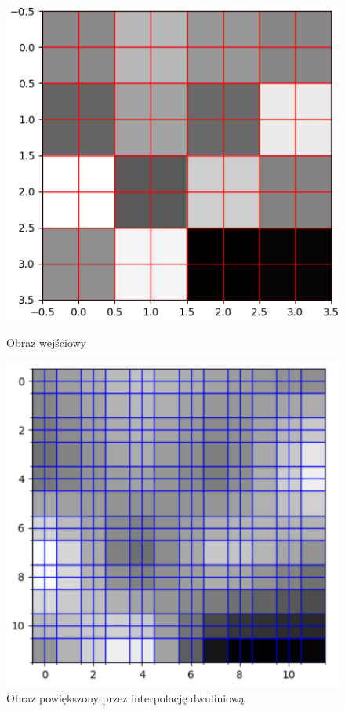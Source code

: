 \begin{figure}[ht]
    \centering
    \begin{minipage}[t]{0.33\linewidth}
        \includegraphics[width=\linewidth]{Rozdziały/02.Podstawy_teoretyczne/bilinear_original.png}
        \caption{Obraz wejściowy}
        \label{fig:image7}
    \end{minipage}
    \hspace{0.5cm}
    \begin{minipage}[t]{0.33\linewidth}
        \includegraphics[width=\linewidth]{Rozdziały/02.Podstawy_teoretyczne/bilinear_enlarged.png}
        \caption{Obraz powiększony przez interpolację dwuliniową}
        \label{fig:image8}
    \end{minipage}
\end{figure}

